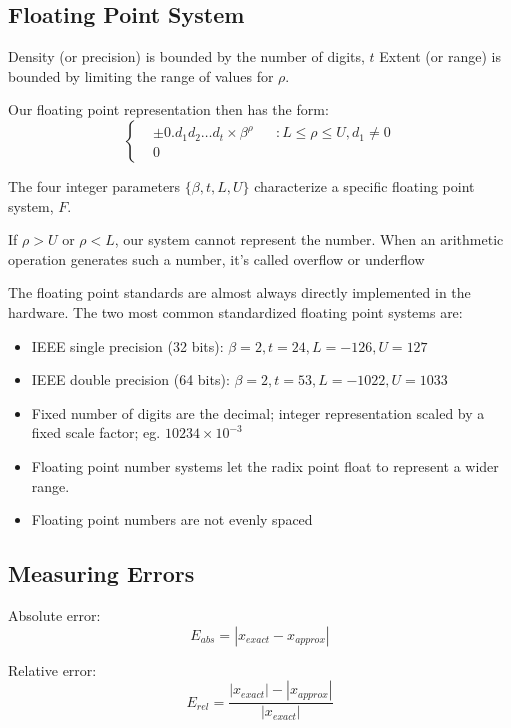 \documentclass[12pt]{article}
\begin{document}
\subsection{Floating Point System}

Density (or precision) is bounded by the number of digits, $t$  
Extent (or range) is bounded by limiting the range of values for $\rho$. 

Our floating point representation then has the form: 
$$  
\left\{\begin{aligned}  
&\pm 0.d_1 d_2 \dots d_t \times \beta^\rho &&: L \leq \rho \leq U, d_1 \neq 0\\  
&0 
\end{aligned}  
\right.$$

The four integer parameters $\{\beta, t, L, U\}$ characterize a specific floating point system, $F$. 


If $\rho > U$ or $\rho < L$, our system cannot represent the number. When an arithmetic operation generates such a number, it's called overflow or underflow

The floating point standards are almost always directly implemented in the hardware. The two most common standardized floating point systems are: 
\begin{itemize}
    \item IEEE single precision (32 bits): $\beta = 2, t=24, L=-126, U=127$
    \item IEEE double precision (64 bits): $\beta = 2, t=53, L=-1022, U=1033$
\end{itemize}

\begin{itemize}
    \item Fixed number of digits are the decimal; integer representation scaled by a fixed scale factor; eg. $10234 \times 10^{-3}$
    \item Floating point number systems let the radix point float to represent a wider range.  
    \item Floating point numbers are not evenly spaced
\end{itemize}


\subsection{Measuring Errors}

Absolute error: 
$$E_{abs} = | x_{exact} - x_{approx} |$$

Relative error: 
$$E_{rel} = \frac{|x_{exact}| - |x_{approx}|} {|x_{exact}|}$$
\end{document}
